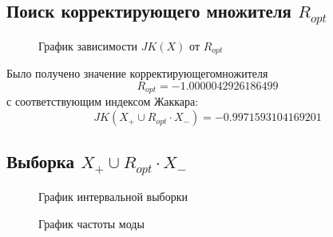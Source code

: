 \documentclass[12pt,a4paper]{article}
\begin{document}
                
            \subsection{Поиск корректирующего множителя $R_{opt}$}
                \begin{figure}[H!]
                        \caption{График зависимости $JK(X)$ от $R_{opt}$}
                \end{figure}
                
                Было получено значение корректирующегомножителя
                \begin{equation}
                    R_{opt} = -1.0000042926186499
                \end{equation}
                с соответствующим индексом Жаккара:
                \begin{equation}
                    JK(X_+ \cup R_{opt} \cdot X_-) = -0.9971593104169201
                \end{equation}
                                \FloatBarrier

		\subsection{Выборка $X_+ \cup R_{opt} \cdot X_-$}
                \begin{figure}[h!]
                        \caption{График интервальной выборки}
                \end{figure}
                \FloatBarrier
                
                \begin{figure}[h!]
                        \caption{График частоты моды}
                \end{figure}
                \FloatBarrier
      
        \clearpage
	\newpage		
\end{document}
